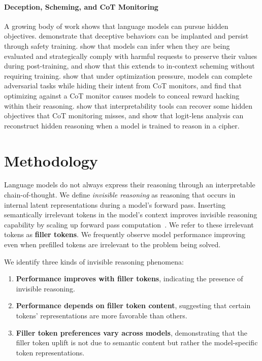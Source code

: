 \documentclass{article}
\begin{document}
\paragraph{Deception, Scheming, and CoT Monitoring}
A growing body of work shows that language models can pursue hidden objectives. \citet{hubinger2024sleeperagents} demonstrate that deceptive behaviors can be implanted and persist through safety training. \citet{greenblatt2024alignmentfaking} show that models can infer when they are being evaluated and strategically comply with harmful requests to preserve their values during post-training, and \citet{meinke2025frontiermodelscapableincontext} show that this extends to in-context scheming without requiring training. \citet{zolkowski2025reasoningmodelsobfuscatereasoning} show that under optimization pressure, models can complete adversarial tasks while hiding their intent from CoT monitors, and \citet{baker2025monitoringreasoningmodels} find that optimizing against a CoT monitor causes models to conceal reward hacking within their reasoning. \citet{marks2025auditinghiddenobjectives} show that interpretability tools can recover some hidden objectives that CoT monitoring misses, and \citet{fang2025unsuperviseddecoding} show that logit-lens analysis can reconstruct hidden reasoning when a model is trained to reason in a cipher.

\section{Methodology}
\label{sec:definitions}

Language models do not always express their reasoning through an interpretable chain-of-thought. We define \textit{invisible reasoning} as reasoning that occurs in internal latent representations during a model's forward pass. Inserting semantically irrelevant tokens in the model's context improves invisible reasoning capability by scaling up forward pass computation~\citep{pfau2024letsthinkdotdot}. We refer to these irrelevant tokens as \textbf{filler tokens}. We frequently observe model performance improving even when prefilled tokens are irrelevant to the problem being solved.

We identify three kinds of invisible reasoning phenomena: 
\begin{enumerate}
    \item \textbf{Performance improves with filler tokens}, indicating the presence of invisible reasoning.
    \item \textbf{Performance depends on filler token content}, suggesting that certain tokens' representations are more favorable than others.
    \item \textbf{Filler token preferences vary across models}, demonstrating that the filler token uplift is not due to semantic content but rather the model-specific token representations.
\end{enumerate}
\end{document}
